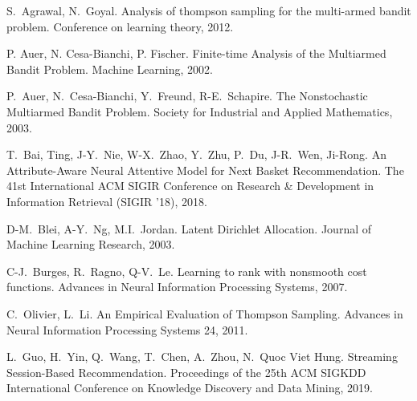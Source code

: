 \documentclass[11pt, dvipdfmx]{article}
\begin{document}
\clearpage
\begin{thebibliography}{10}
\itemsep=1pt
\begin{small}

 S.~Agrawal, N.~Goyal.
\newblock Analysis of thompson sampling for the multi-armed bandit problem.
\newblock Conference on learning theory, 2012.

 P. Auer, N. Cesa-Bianchi, P. Fischer.
\newblock Finite-time Analysis of the Multiarmed Bandit Problem.
\newblock Machine Learning, 2002.


 P.~Auer, N.~Cesa-Bianchi, Y.~Freund, R-E.~Schapire.
\newblock The Nonstochastic Multiarmed Bandit Problem.
\newblock Society for Industrial and Applied Mathematics, 2003.

 T.~Bai, Ting, J-Y.~Nie, W-X.~Zhao, Y.~Zhu, P.~Du, J-R.~Wen, Ji-Rong.
\newblock An Attribute-Aware Neural Attentive Model for Next Basket Recommendation.
\newblock The 41st International ACM SIGIR Conference on Research \& Development in Information Retrieval (SIGIR '18), 2018.
  
 D-M.~Blei, A-Y.~Ng, M.I.~Jordan.
\newblock Latent Dirichlet Allocation.
\newblock Journal of Machine Learning Research, 2003.

 C-J.~Burges, R.~Ragno, Q-V.~Le.
\newblock Learning to rank with nonsmooth cost functions.
\newblock Advances in Neural Information Processing Systems, 2007.

 C.~Olivier, L.~Li.
\newblock An Empirical Evaluation of Thompson Sampling.
\newblock Advances in Neural Information Processing Systems 24, 2011.

 L.~Guo, H.~Yin, Q.~Wang, T.~Chen, A.~Zhou, N.~Quoc Viet Hung.
\newblock Streaming Session-Based Recommendation.
\newblock Proceedings of the 25th ACM SIGKDD International Conference on Knowledge Discovery and Data Mining, 2019.


\end{small}
\end{thebibliography}
\end{document}
